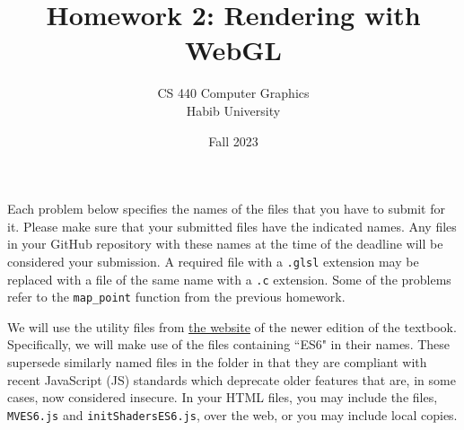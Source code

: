 \documentclass[addpoints]{exam}
\title{Homework 2: Rendering with WebGL}
\author{CS 440 Computer Graphics\\Habib University}
\date{Fall 2023}
\begin{document}
\maketitle

Each problem below specifies the names of the files that you have to submit for it. Please make sure that your submitted files have the indicated names. Any files in your GitHub repository with these names at the time of the deadline will be considered your submission. A required file with a \texttt{.glsl} extension may be replaced with a file of the same name with a \texttt{.c} extension. Some of the problems refer to the {\tt map\_point} function from the previous homework.

We will use the utility files from \href{https://bit.ly/3Bqt8XG}{the website} of the newer edition of the textbook. Specifically, we will make use of the files containing ``ES6" in their names. These supersede similarly named files in the folder in that they are compliant with recent JavaScript (JS) standards which deprecate older features that are, in some cases, now considered insecure. In your HTML files, you may include the files, \texttt{MVES6.js} and \texttt{initShadersES6.js}, over the web, or you may include local copies.

\begin{comment}
  \begin{itemize}
  \item Make colorabrs in different ways. Explain we will do it in many ways before ultimately doing it the right way.
    \begin{itemize}
    \item pass canvas width, W, as a uniform
    \item draw W vertical lines. (2W vertices) assign colors in verex shader, with menu choice for grayscale or colors
    \item make 2 triangles, do not send color, rather compute color for each fragment in fragment shader based on fragCoord
    \item make 2 triangles, assign color to vertices
    \item use above approach to render the colorbar with 6 or fewer vertices,
    \item [stretch] Draw both bars together using the above technique, either in different viewports in the same canvas, or on different canva on the same page.
    \end{itemize}
  \end{itemize}
\end{comment}
\end{document}

